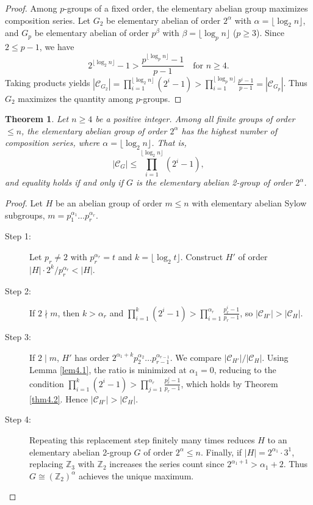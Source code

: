 \documentclass[11pt,a4paper]{article}
\newtheorem{theorem}{Theorem}[section]
\theoremstyle{definition}
\begin{document}
\begin{proof}
Among $p$-groups of a fixed order, the elementary abelian group maximizes composition series. Let $G_2$ be elementary abelian of order $2^\alpha$ with $\alpha = \lfloor \log_2 n \rfloor$, and $G_p$ be elementary abelian of order $p^\beta$ with $\beta = \lfloor \log_p n \rfloor$ ($p \ge 3$).
Since $2 \le p - 1$, we have
\begin{equation}\label{eq1}
2^{\lfloor \log_2 n \rfloor} - 1 > \frac{p^{\lfloor \log_p n \rfloor} - 1}{p - 1} \quad \text{for } n \ge 4.
\end{equation}
Taking products yields $|\mathcal{C}_{G_2}| = \prod_{i=1}^{\lfloor \log_2 n \rfloor}(2^i - 1) > \prod_{i=1}^{\lfloor \log_p n \rfloor}\frac{p^i - 1}{p - 1} = |\mathcal{C}_{G_p}|$. Thus $G_2$ maximizes the quantity among $p$-groups.
\end{proof}

\begin{theorem}\label{thm4.3}
Let $n \ge 4$ be a positive integer. Among all finite groups of order $\le n$, the elementary abelian group of order $2^\alpha$ has the highest number of composition series, where $\alpha = \lfloor \log_2 n \rfloor$. That is,
\[
|\mathcal{C}_G| \le \prod_{i=1}^{\lfloor \log_2 n \rfloor} (2^i - 1),
\]
and equality holds if and only if $G$ is the elementary abelian 2-group of order $2^\alpha$.
\end{theorem}

\begin{proof}
Let $H$ be an abelian group of order $m \le n$ with elementary abelian Sylow subgroups, $m = p_1^{\alpha_1} \dots p_r^{\alpha_r}$.

\begin{description}
\item[Step 1:] Let $p_r \neq 2$ with $p_r^{\alpha_r} = t$ and $k = \lfloor \log_2 t \rfloor$. Construct $H'$ of order $|H| \cdot 2^k / p_r^{\alpha_r} < |H|$.
\item[Step 2:] If $2 \nmid m$, then $k > \alpha_r$ and $\prod_{i=1}^k (2^i - 1) > \prod_{i=1}^{\alpha_r} \frac{p_r^i - 1}{p_r - 1}$, so $|\mathcal{C}_{H'}| > |\mathcal{C}_H|$.
\item[Step 3:] If $2 \mid m$, $H'$ has order $2^{\alpha_1 + k} p_2^{\alpha_2} \dots p_{r-1}^{\alpha_{r-1}}$. We compare $|\mathcal{C}_{H'}| / |\mathcal{C}_H|$. Using Lemma \ref{lem4.1}, the ratio is minimized at $\alpha_1 = 0$, reducing to the condition $\prod_{i=1}^k (2^i - 1) > \prod_{j=1}^{\alpha_r} \frac{p_r^j - 1}{p_r - 1}$, which holds by Theorem \ref{thm4.2}. Hence $|\mathcal{C}_{H'}| > |\mathcal{C}_H|$.
\item[Step 4:] Repeating this replacement step finitely many times reduces $H$ to an elementary abelian 2-group $G$ of order $2^\alpha \le n$. Finally, if $|H| = 2^{\alpha_1} \cdot 3^1$, replacing $\mathbb{Z}_3$ with $\mathbb{Z}_2$ increases the series count since $2^{\alpha_1+1} > \alpha_1 + 2$. Thus $G \cong (\mathbb{Z}_2)^\alpha$ achieves the unique maximum.
\end{description}
\end{proof}
\end{document}
